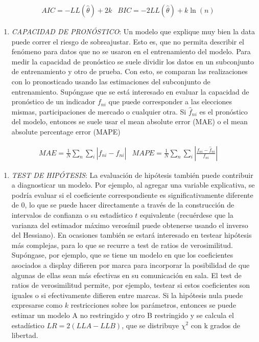 \documentclass[
]{book}
\providecommand{\tightlist}{%
  \setlength{\itemsep}{0pt}\setlength{\parskip}{0pt}}
\begin{document}
\begin{equation}
\begin{array}{cc}
AIC = -LL(\hat{\theta}) + 2k & BIC =-2LL(\hat{\theta}) + k\ln(n)
\end{array}
\label{eq:aicbic}
\end{equation}

\begin{enumerate}
\def\labelenumi{\arabic{enumi}.}
\tightlist
\item
  \emph{CAPACIDAD DE PRONÓSTICO}: Un modelo que explique muy bien la data puede correr el riesgo de sobreajustar. Esto es, que no permita describir el fenómeno para datos que no se usaron en el entrenamiento del modelo. Para medir la capacidad de pronóstico se suele dividir los datos en un subconjunto de entrenamiento y otro de prueba. Con esto, se comparan las realizaciones con lo pronosticado usando las estimaciones del subconjunto de entrenamiento. Supóngase que se está interesado en evaluar la capacidad de pronóstico de un indicador \(f_{ni}\) que puede corresponder a las elecciones mismas, participaciones de mercado o cualquier otra. Si \(\hat{f}_{ni}\) es el pronóstico del modelo, entonces se suele usar el mean
  absolute error (MAE) o el mean absolute percentage error (MAPE)
\end{enumerate}

\begin{equation}
\begin{array}{cc}
MAE = \frac{1}{N} \sum_n \sum_i |f_{ni} - \hat{f}_{ni}| &MAPE = \frac{1}{N} \sum_n \sum_i \left| \frac{f_{ni} - \hat{f}_{ni}}{f_{ni}} \right|
\end{array}
\label{eq:maemape}
\end{equation}

\begin{enumerate}
\def\labelenumi{\arabic{enumi}.}
\setcounter{enumi}{2}
\tightlist
\item
  \emph{TEST DE HIPÓTESIS}: La evaluación de hipótesis también puede contribuir a diagnosticar un modelo. Por ejemplo, al agregar una variable explicativa, se podría evaluar si el coeficiente correspondiente es significativamente diferente de 0, lo que se puede hacer directamente a través de la construcción de intervalos de confianza o su estadístico \(t\) equivalente (recuérdese que la varianza del estimador máximo verosímil puede obtenerse usando el inverso del Hessiano). En ocasiones también se estará interesado en testear hipótesis más complejas, para lo que se recurre a test de ratios de verosimilitud. Supóngase, por ejemplo, que se tiene un modelo en que los coeficientes asociados a display difieren por marca para incorporar la posibilidad de que algunas de ellas sean más efectivas en su comunicación en sala. El test de ratios de verosimilitud permite, por ejemplo, testear si estos coeficientes son iguales o si efectivamente difieren entre marcas. Si la hipótesis nula puede expresarse como \(k\) restricciones sobre los parámetros, entonces se puede estimar un modelo A no restringido y otro B restringido y se calcula el estadístico \(LR = 2(LLA − LLB)\), que se distribuye \(\chi^2\)
  con k grados de libertad.
\end{enumerate}
\end{document}
